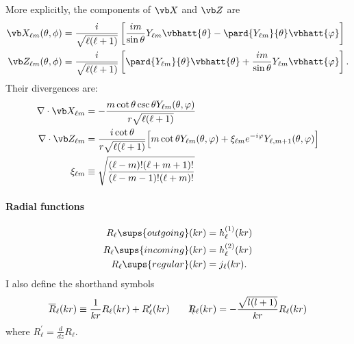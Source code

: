\documentclass[letterpaper]{article}
\newcommand{\lm}{_{\ell m}}
\newcommand{\RBar}{\overline{R}}
\newcommand{\RSlash}{\backslash\hspace{-0.08in}R}
\begin{document}
\noindent More explicitly, the components of $\vb X$ and $\vb Z$ are
\begin{align*}
\vb X\lm(\theta, \phi) 
&= 
   \frac{i}{\sqrt{\ell(\ell+1)}}
   \left[  \frac{im}{\sin\theta}Y_{\ell m} \vbhatt{\theta}
           -\pard{Y_{\ell m}}{\theta}\vbhatt{\varphi}
   \right]
\\
\vb Z\lm(\theta, \phi) 
&=
   \frac{i}{\sqrt{\ell(\ell+1)}}
   \left[   \pard{Y_{\ell m}}{\theta}\vbhatt{\theta}
           +\frac{im}{\sin\theta}Y_{\ell m} \vbhatt{\varphi}
   \right].
\end{align*}
Their divergences are:
\begin{subequations}
\begin{align}
\nabla \cdot \vb X\lm
 &=-\frac{m\cot\theta\csc\theta Y\lm(\theta,\varphi)}
         {r\sqrt{\ell(\ell+1)}}
\\
\nabla \cdot \vb Z\lm
 &= \frac{i\cot\theta}{r \sqrt{\ell(\ell+1)}}
    \Big[ m\cot\theta Y\lm(\theta, \varphi)
          + \xi\lm e^{-i\varphi}Y_{\ell,m+1}(\theta,\varphi)
    \Big]
\\
\xi\lm&\equiv\sqrt\frac{ (\ell-m)! (\ell+m+1)!}{(\ell-m-1)!(\ell+m)!}
\end{align}
\label{XZDivergences}
\end{subequations}

\paragraph{Radial functions}
\begin{align*}
 R_\ell \sups{outgoing}(kr)  &= h^{(1)}_\ell(kr) \\
 R_\ell \sups{incoming}(kr)  &= h^{(2)}_\ell(kr) \\
 R_\ell \sups{regular}(kr)   &= j_\ell(kr).
\end{align*}
I also define the shorthand symbols
$$ \RBar_\ell(kr)
   \equiv 
   \frac{1}{kr}R_\ell(kr) + R^\prime_\ell(kr)
   \qquad
   \RSlash_\ell(kr) = -\frac{\sqrt{l(l+1)}}{kr} R_\ell(kr)
$$
where $R^\prime_\ell = \frac{d}{dz}R_\ell.$
\end{document}

